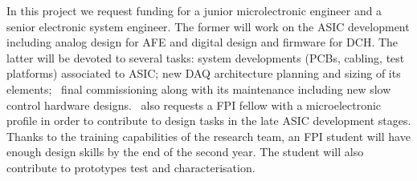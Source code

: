 In this project we request funding for a junior microlectronic engineer and a senior electronic system engineer. The former will work on the ASIC development including analog design for AFE and digital design and firmware for DCH. The latter will be devoted to several tasks: system developments (PCBs, cabling, test platforms) associated to ASIC; new DAQ architecture planning and sizing of its elements; \Next\ final commissioning along with its maintenance including new slow control hardware designs. 
\sUPV\ also requests a FPI fellow with a microelectronic profile in order to contribute to design tasks in the late ASIC development stages. Thanks to the training capabilities of the research team, an FPI student will have enough design skills by the end of the second year. The student will also contribute to prototypes test and characterisation.

